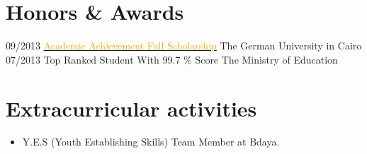 \documentclass[]{friggeri-cv}
\begin{document}
\section{Honors \& Awards}
\begin{entrylist}
  \entry
    {09/2013}
    {\href{https://drive.google.com/open?id=19nxGmnJJkMHri0zitiv5pXWpjLnGhKvk}{ \textcolor{orange}{Academic Achievement Full Scholarship}}}
    {The German University in Cairo}
    {\emph{}}
    \entry
    {07/2013}
    {Top Ranked Student With 99.7 \% Score}
    {The Ministry of Education}
    {\emph{}}
   \end{entrylist}
   \section{Extracurricular activities}
   \begin{itemize}
   \item  Y.E.S (Youth Establishing Skills) Team Member at Bdaya.
 
   \end{itemize}
\end{document}

